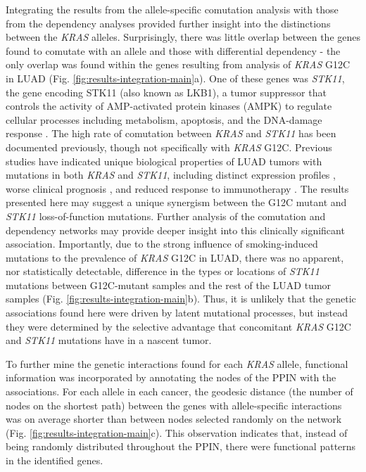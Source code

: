 \documentclass[english, 10pt, letterpaper]{article}
\newcommand{\KRAS}{\emph{KRAS}}
\begin{document}
Integrating the results from the allele-specific comutation analysis with those from the dependency analyses provided further insight into the distinctions between the \KRAS{} alleles.
Surprisingly, there was little overlap between the genes found to comutate with an allele and those with differential dependency - the only overlap was found within the genes resulting from analysis of \KRAS{} G12C in LUAD (Fig. \ref{fig:results-integration-main}a).
One of these genes was \emph{STK11}, the gene encoding STK11 (also known as LKB1), a tumor suppressor that controls the activity of AMP-activated protein kinases (AMPK) to regulate cellular processes including metabolism, apoptosis, and the DNA-damage response \cite{Momcilovic2015TargetingVulnerabilities., Korsse2013TargetingCancer.}.
The high rate of comutation between \KRAS{} and \emph{STK11} has been documented previously, though not specifically with \KRAS{} G12C.
Previous studies have indicated unique biological properties of LUAD tumors with mutations in both \KRAS{} and \emph{STK11}, including distinct expression profiles \cite{Skoulidis2015Co-occurringVulnerabilities.}, worse clinical prognosis \cite{LaFleur2019MutationSTK11, Bange2019ImpactCancer.}, and reduced response to immunotherapy \cite{Skoulidis2018STK11/LKB1Adenocarcinoma.}.
The results presented here may suggest a unique synergism between the G12C mutant and \emph{STK11} loss-of-function mutations.
Further analysis of the comutation and dependency networks may provide deeper insight into this clinically significant association.
Importantly, due to the strong influence of smoking-induced mutations to the prevalence of \KRAS{} G12C in LUAD, there was no apparent, nor statistically detectable, difference in the types or locations of \emph{STK11} mutations between G12C-mutant samples and the rest of the LUAD tumor samples (Fig. \ref{fig:results-integration-main}b).
Thus, it is unlikely that the genetic associations found here were driven by latent mutational processes, but instead they were determined by the selective advantage that concomitant \KRAS{} G12C and \emph{STK11} mutations have in a nascent tumor.

To further mine the genetic interactions found for each \KRAS{} allele, functional information was incorporated by annotating the nodes of the PPIN with the associations.
For each allele in each cancer, the geodesic distance (the number of nodes on the shortest path) between the genes with allele-specific interactions was on average shorter than between nodes selected randomly on the network (Fig. \ref{fig:results-integration-main}c).
This observation indicates that, instead of being randomly distributed throughout the PPIN, there were functional patterns in the identified genes.
\end{document}
